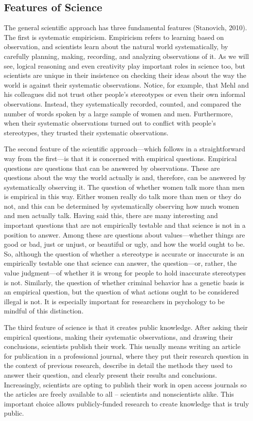 \subsection{Features of Science}
The general scientific approach has three fundamental features (Stanovich, 2010). The first is systematic empiricism. Empiricism refers to learning based on observation, and scientists learn about the natural world systematically, by carefully planning, making, recording, and analyzing observations of it. As we will see, logical reasoning and even creativity play important roles in science too, but scientists are unique in their insistence on checking their ideas about the way the world is against their systematic observations. Notice, for example, that Mehl and his colleagues did not trust other people's stereotypes or even their own informal observations. Instead, they systematically recorded, counted, and compared the number of words spoken by a large sample of women and men. Furthermore, when their systematic observations turned out to conflict with people's stereotypes, they trusted their systematic observations.

The second feature of the scientific approach---which follows in a straightforward way from the first---is that it is concerned with empirical questions. Empirical questions are questions that can be answered by observations. These are questions about the way the world actually is and, therefore, can be answered by systematically observing it. The question of whether women talk more than men is empirical in this way. Either women really do talk more than men or they do not, and this can be determined by systematically observing how much women and men actually talk. Having said this, there are many interesting and important questions that are not empirically testable and that science is not in a position to answer. Among these are questions about values---whether things are good or bad, just or unjust, or beautiful or ugly, and how the world ought to be. So, although the question of whether a stereotype is accurate or inaccurate is an empirically testable one that science can answer, the question---or, rather, the value judgment---of whether it is wrong for people to hold inaccurate stereotypes is not. Similarly, the question of whether criminal behavior has a genetic basis is an empirical question, but the question of what actions ought to be considered illegal is not. It is especially important for researchers in psychology to be mindful of this distinction.

The third feature of science is that it creates public knowledge. After asking their empirical questions, making their systematic observations, and drawing their conclusions, scientists publish their work. This usually means writing an article for publication in a professional journal, where they put their research question in the context of previous research, describe in detail the methods they used to answer their question, and clearly present their results and conclusions. Increasingly, scientists are opting to publish their work in open access journals so the articles are freely available to all -- scientists and nonscientists alike. This important choice allows publicly-funded research to create knowledge that is truly public.

